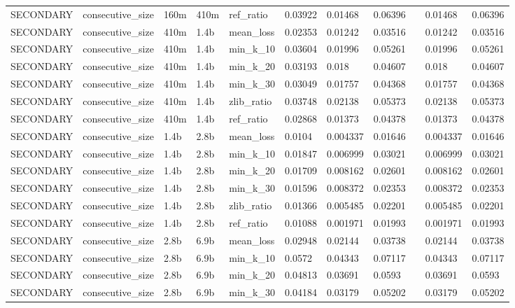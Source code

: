 \begin{tabular}{lllllllllll}
SECONDARY & consecutive\_size & 160m & 410m & ref\_ratio & 0.03922 & 0.01468 & 0.06396 &  & 0.01468 & 0.06396 \\
SECONDARY & consecutive\_size & 410m & 1.4b & mean\_loss & 0.02353 & 0.01242 & 0.03516 &  & 0.01242 & 0.03516 \\
SECONDARY & consecutive\_size & 410m & 1.4b & min\_k\_10 & 0.03604 & 0.01996 & 0.05261 &  & 0.01996 & 0.05261 \\
SECONDARY & consecutive\_size & 410m & 1.4b & min\_k\_20 & 0.03193 & 0.018 & 0.04607 &  & 0.018 & 0.04607 \\
SECONDARY & consecutive\_size & 410m & 1.4b & min\_k\_30 & 0.03049 & 0.01757 & 0.04368 &  & 0.01757 & 0.04368 \\
SECONDARY & consecutive\_size & 410m & 1.4b & zlib\_ratio & 0.03748 & 0.02138 & 0.05373 &  & 0.02138 & 0.05373 \\
SECONDARY & consecutive\_size & 410m & 1.4b & ref\_ratio & 0.02868 & 0.01373 & 0.04378 &  & 0.01373 & 0.04378 \\
SECONDARY & consecutive\_size & 1.4b & 2.8b & mean\_loss & 0.0104 & 0.004337 & 0.01646 &  & 0.004337 & 0.01646 \\
SECONDARY & consecutive\_size & 1.4b & 2.8b & min\_k\_10 & 0.01847 & 0.006999 & 0.03021 &  & 0.006999 & 0.03021 \\
SECONDARY & consecutive\_size & 1.4b & 2.8b & min\_k\_20 & 0.01709 & 0.008162 & 0.02601 &  & 0.008162 & 0.02601 \\
SECONDARY & consecutive\_size & 1.4b & 2.8b & min\_k\_30 & 0.01596 & 0.008372 & 0.02353 &  & 0.008372 & 0.02353 \\
SECONDARY & consecutive\_size & 1.4b & 2.8b & zlib\_ratio & 0.01366 & 0.005485 & 0.02201 &  & 0.005485 & 0.02201 \\
SECONDARY & consecutive\_size & 1.4b & 2.8b & ref\_ratio & 0.01088 & 0.001971 & 0.01993 &  & 0.001971 & 0.01993 \\
SECONDARY & consecutive\_size & 2.8b & 6.9b & mean\_loss & 0.02948 & 0.02144 & 0.03738 &  & 0.02144 & 0.03738 \\
SECONDARY & consecutive\_size & 2.8b & 6.9b & min\_k\_10 & 0.0572 & 0.04343 & 0.07117 &  & 0.04343 & 0.07117 \\
SECONDARY & consecutive\_size & 2.8b & 6.9b & min\_k\_20 & 0.04813 & 0.03691 & 0.0593 &  & 0.03691 & 0.0593 \\
SECONDARY & consecutive\_size & 2.8b & 6.9b & min\_k\_30 & 0.04184 & 0.03179 & 0.05202 &  & 0.03179 & 0.05202 \\

\end{tabular}
